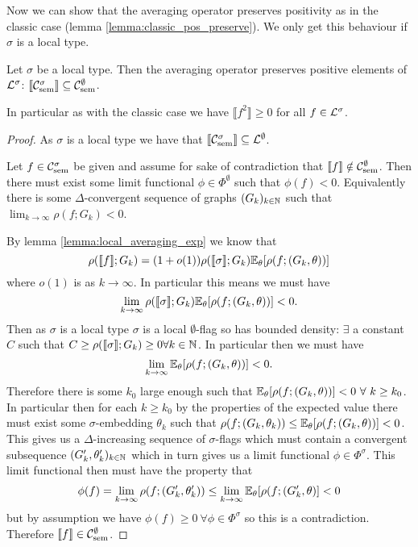 Now we can show that the averaging operator preserves positivity as in the
classic case (lemma \ref{lemma:classic_pos_preserve}). We only get this
behaviour if $\sigma$ is a local type.

\begin{lemma}
    \label{lemma:local_pos_preserve}
    Let $\sigma$ be a local type. Then the averaging operator preserves positive
    elements of $\mathcal{L}^\sigma$:
    $\llbracket \mathcal{C}_\mathrm{sem}^\sigma \rrbracket \subseteq  \mathcal{C}_\mathrm{sem}^\emptyset$.

    In particular as with the classic case we have $\llbracket f^2 \rrbracket \geq 0$
    for all $f\in\mathcal{L}^\sigma$.
\end{lemma}

\begin{proof}
    As $\sigma$ is a local type we have that
    $\llbracket \mathcal{C}_\mathrm{sem}^\sigma \rrbracket \subseteq \mathcal{L}^\emptyset$.

    Let $f\in\mathcal{C}_\mathrm{sem}^\sigma$ be given and assume for sake of contradiction that
    $\llbracket f \rrbracket \notin\mathcal{C}_\mathrm{sem}^\emptyset$. Then there must exist
    some limit functional $\phi\in\Phi^\emptyset$ such that $\phi(f)<0$. Equivalently
    there is some $\Delta$-convergent sequence of graphs $(G_k)_{k\in\mathbb{N}}$
    such that $\lim_{k\to\infty}\rho(f; G_k) < 0$.

    By lemma \ref{lemma:local_averaging_exp} we know that
    \[
        \rho(\llbracket f\rrbracket; G_k) = (1+o(1)) \rho(\llbracket \sigma \rrbracket; G_k)
        \mathbb{E}_\theta[\rho(f; (G_k,\theta))]
    \]
    where $o(1)$ is as $k \to \infty$.
    In particular this means we must have
    \[
        \lim_{k\to\infty} \rho(\llbracket \sigma \rrbracket; G_k)
        \mathbb{E}_\theta[\rho(f; (G_k,\theta))] < 0.
    \]
    Then as $\sigma$ is a local type $\sigma$ is a local $\emptyset$-flag so has bounded
    density: $\exists$ a constant $C$ such that $C \geq \rho(\llbracket\sigma\rrbracket; G_k) \geq
    0\forall k\in\mathbb{N}$. In particular then we must have
    \[
        \lim_{k\to\infty} \mathbb{E}_\theta[\rho(f; (G_k,\theta))] < 0.
    \]
    Therefore there is some $k_0$ large enough such that
    $\mathbb{E}_\theta[\rho(f; (G_k, \theta))] < 0\ \forall\ k \geq k_0$. In particular then
    for each $k \geq k_0$ by the properties of the expected value there must exist
    some $\sigma$-embedding $\theta_k$ such that
    $\rho(f; (G_k, \theta_k)) \leq \mathbb{E}_\theta[\rho(f; (G_k,\theta))] < 0$. This gives
    us a $\Delta$-increasing sequence of $\sigma$-flags which must contain a convergent
    subsequence $(G'_k, \theta'_k)_{k\in\mathbb{N}}$
    which in turn gives us a limit functional $\phi\in\Phi^\sigma$. This limit functional
    then must have the property that
    \[
        \phi(f) = \lim_{k\to\infty}\rho(f; (G'_k, \theta'_k))
        \leq \lim_{k\to\infty} \mathbb{E}_\theta[\rho(f; (G'_k, \theta)] < 0
    \]
    but by assumption we have $\phi(f) \geq 0\ \forall \phi\in\Phi^\sigma$ so this is
    a contradiction. Therefore $\llbracket f \rrbracket \in\mathcal{C}_\mathrm{sem}^\emptyset$.
\end{proof}

